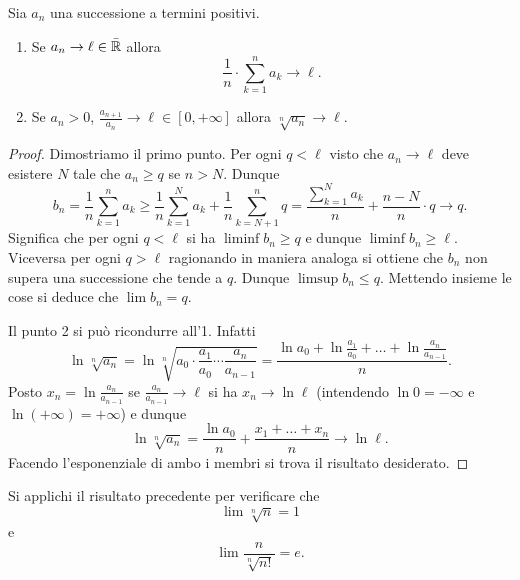 \begin{theorem}
  \label{th:criterio_cesaro}%
  \mymark{*}%
%
  Sia $a_n$ una successione a termini positivi.
  \begin{enumerate}
  \item
    Se
    $   a_n \to \ell \in \bar {{\mathbb R}}$
    allora
    \[
    \frac 1 n \cdot \displaystyle\sum_{k=1}^n a_k \to \ell.
    \]
  
  \item
    Se $a_n>0$,
    $\displaystyle\frac{a_{n+1}}{a_n} \to \ell \in [0,+\infty]$
    allora
    $\displaystyle \sqrt[n]{a_n}\to \ell$.
  \end{enumerate}
  \end{theorem}
  \begin{proof}
  Dimostriamo il primo punto.
  Per ogni $q<\ell$ visto che $a_n\to \ell$ deve esistere $N$ tale che 
  $a_n\ge q$ se $n> N$. 
  Dunque 
  \[
    b_n = \frac 1 n \sum_{k=1}^{n} a_k 
    \ge \frac 1 n \sum_{k=1}^N a_k + \frac 1 n \sum_{k=N+1}^n q 
    = \frac{\sum_{k=1}^N a_k}{n} + \frac{n-N}{n}\cdot q \to q.
  \]
  Significa che per ogni $q<\ell$ si ha $\liminf b_n \ge q$ e 
  dunque $\liminf b_n \ge \ell$.
  Viceversa per ogni $q>\ell$ ragionando in maniera analoga si ottiene 
  che $b_n$ non supera una successione che tende a $q$.
  Dunque $\limsup b_n\le q$. 
  Mettendo insieme le cose si deduce che $\lim b_n = q$.
    
  Il punto 2 si può ricondurre all'1.
  Infatti
  \[
    \ln \sqrt[n]{a_n}
    = \ln \sqrt[n]{a_0\cdot \frac{a_1}{a_0} \cdots \frac{a_n}{a_{n-1}}}
    = \frac{\ln a_0 + \ln \frac{a_1}{a_0} + \dots + \ln \frac{a_n}{a_{n-1}}}{n}.
  \]
  Posto $x_n = \ln \frac{a_n}{a_{n-1}}$
  se $\frac{a_n}{a_{n-1}}\to \ell$
  si ha $x_n\to \ln \ell$ (intendendo $\ln 0 = -\infty$ e $\ln (+\infty)=+\infty$) e dunque
  \[
    \ln \sqrt[n]{a_n} = \frac{\ln a_0}{n} + \frac{x_1 + \dots + x_n}{n}
    \to \ln \ell.
  \]
  Facendo l'esponenziale di ambo i membri si trova il risultato desiderato.
  \end{proof}
  
  \begin{exercise}\label{ex:7340098}
  Si applichi il risultato precedente per
  verificare che
  \[
     \lim \sqrt[n]{n} = 1
  \]
 e
 \[
   \lim \frac{n}{\sqrt[n]{n!}} = e.
 \]
 \end{exercise}


